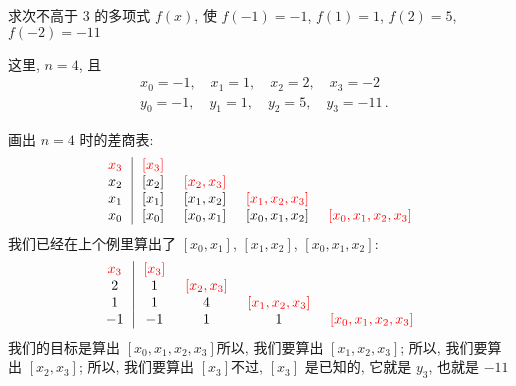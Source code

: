 \begin{example}
    求次不高于 $3$ 的多项式 $f(x)$, 使 $f(-1)=-1$, $f(1)=1$, $f(2)=5$, $f(-2) = -11$\period

    这里, $n = 4$, 且
    \begin{align*}
         & x_0 = -1, \quad x_1 = 1, \quad x_2 = 2, \quad x_3 = -2          \\
         & y_0 = -1, \quad y_1 = 1, \quad y_2 = 5, \quad y_3 = -11 \period
    \end{align*}

    画出 $n = 4$ 时的差商表:
    \begin{align*}
        \arraycolsep=0.25cm
        \begin{array}{c|cccc}
            \textcolor{red}{x_3} & \textcolor{red}{[x_3]} & \                           & \                                & \                                     \\
            x_2                  & [x_2]                  & \textcolor{red}{[x_2, x_3]} & \                                & \                                     \\
            x_1                  & [x_1]                  & [x_1, x_2]                  & \textcolor{red}{[x_1, x_2, x_3]} & \                                     \\
            x_0                  & [x_0]                  & [x_0, x_1]                  & [x_0, x_1, x_2]                  & \textcolor{red}{[x_0, x_1, x_2, x_3]} \\
        \end{array}
    \end{align*}
    我们已经在上个例里算出了 $[x_0, x_1]$, $[x_1, x_2]$, $[x_0, x_1, x_2]$:
    \begin{align*}
        \arraycolsep=0.25cm
        \begin{array}{c|cccc}
            \textcolor{red}{x_3} & \textcolor{red}{[x_3]} & \                           & \                                & \                                     \\
            2                    & 1                      & \textcolor{red}{[x_2, x_3]} & \                                & \                                     \\
            1                    & 1                      & 4                           & \textcolor{red}{[x_1, x_2, x_3]} & \                                     \\
            -1                   & -1                     & 1                           & 1                                & \textcolor{red}{[x_0, x_1, x_2, x_3]} \\
        \end{array}
    \end{align*}
    我们的目标是算出 $[x_0, x_1, x_2, x_3]$\period 所以, 我们要算出 $[x_1, x_2, x_3]$; 所以, 我们要算出 $[x_2, x_3]$; 所以, 我们要算出 $[x_3]$\period 不过, $[x_3]$ 是已知的, 它就是 $y_3$, 也就是 $-11$\period


\end{example}
